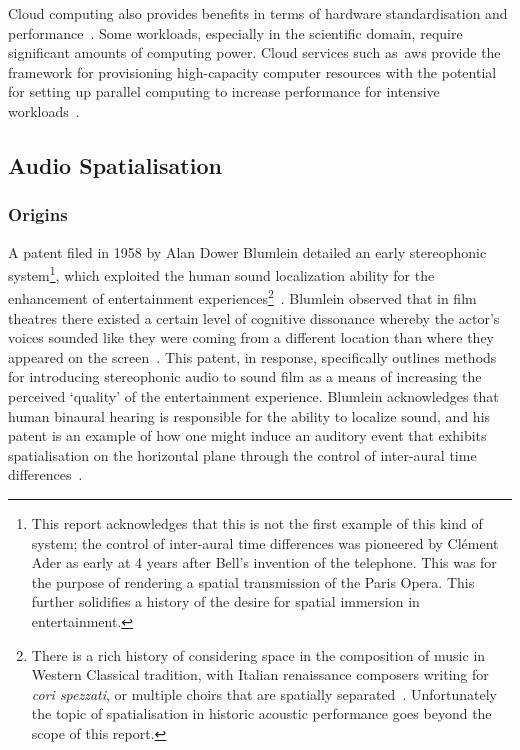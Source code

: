 Cloud computing also provides benefits in terms of hardware standardisation and performance~\citep{rehr_scientific}.
Some workloads, especially in the scientific domain, require significant amounts of computing power.
Cloud services such as~\gls{aws} provide the framework
for provisioning high-capacity computer resources with the potential
for setting up parallel computing to increase performance for intensive workloads~\citep{rehr_scientific}.

\subsection{Audio Spatialisation}\label{subsec:audio-spatialisation}
\subsubsection{Origins}

A patent filed in 1958 by Alan Dower Blumlein detailed an early stereophonic system\footnote{This report acknowledges that this is not the first example of this kind of system; the control of inter-aural time differences was pioneered by Cl\'ement Ader as early at 4 years after Bell's invention of the telephone. This was for the purpose of rendering a spatial transmission of the Paris Opera. This further solidifies a history of the desire for spatial immersion in entertainment.}, which exploited the human sound localization ability for the enhancement of entertainment experiences\footnote{There is a rich history of considering space in the composition of music in Western Classical tradition, with Italian renaissance composers writing for \textit{cori spezzati}, or multiple choirs that are spatially separated~\citep{spezzati}. Unfortunately the topic of spatialisation in historic acoustic performance goes beyond the scope of this report.}~\citep{blumlein-patent}.
Blumlein observed that in film theatres there existed a certain level of cognitive dissonance whereby the actor’s voices sounded like they were coming from a different location than where they appeared on the screen~\citep{alexander_blumlein}.
This patent, in response,
specifically outlines methods for introducing stereophonic audio to sound film as a means
of increasing the perceived `quality' of the entertainment experience.
Blumlein acknowledges that human binaural hearing is responsible for the ability to localize sound, and his patent is an example of how one might induce an auditory event that exhibits spatialisation on the horizontal plane through the control of inter-aural time differences~\citep{blumlein-patent}.


